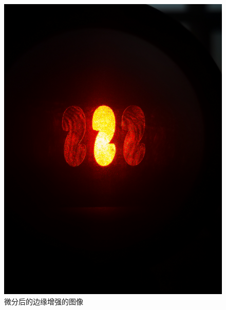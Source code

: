 \documentclass{buaaemp}
\begin{document}
\begin{figure}
    \centering
    \includegraphics[width=\linewidth]{image/微信图片_20221109232921.jpg}
    \caption{微分后的边缘增强的图像}
    \label{fig:my_label2}
\end{figure}
\end{document}
